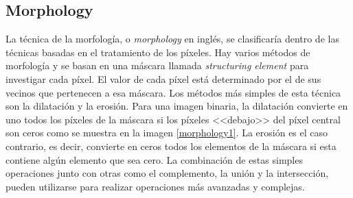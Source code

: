 \subsection{Morphology}

La t\'{e}cnica de la morfolog\'{i}a, o \textit{morphology} en ingl\'{e}s, se clasificar\'{i}a dentro de las t\'{e}cnicas basadas en el tratamiento de los p\'{i}xeles. Hay varios m\'{e}todos de morfolog\'{i}a y se basan en una m\'{a}scara llamada \textit{structuring element} para investigar cada p\'{i}xel. El valor de cada p\'{i}xel est\'{a} determinado por el de sus vecinos que pertenecen a esa m\'{a}scara. Los m\'{e}todos m\'{a}s simples de esta t\'{e}cnica son la dilataci\'{o}n y la erosi\'{o}n. Para una imagen binaria, la dilataci\'{o}n convierte en uno todos los p\'{i}xeles de la m\'{a}scara si los p\'{i}xeles <<debajo>> del p\'{i}xel central son ceros como se muestra en la imagen \ref{morphology1}. La erosi\'{o}n es el caso contrario, es decir, convierte en ceros todos los elementos de la m\'{a}scara si esta contiene alg\'{u}n elemento que sea cero. La combinaci\'{o}n de estas simples operaciones junto con otras como el complemento, la uni\'{o}n y la intersecci\'{o}n, pueden utilizarse para realizar operaciones m\'{a}s avanzadas y complejas. 
 

